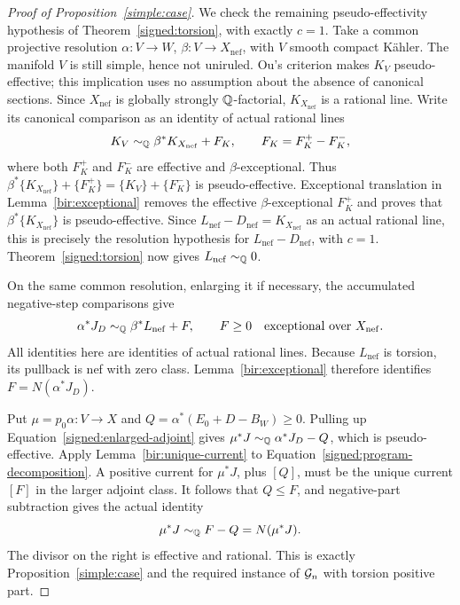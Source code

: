 \begin{proof}[Proof of Proposition~\ref{simple:case}]
We check the remaining pseudo-effectivity hypothesis of
Theorem~\ref{signed:torsion}, with exactly \(c=1\).
Take a common projective resolution
\(\alpha:V\to W\), \(\beta:V\to X_{\mathrm{nef}}\), with \(V\) smooth
compact Kähler.  The manifold \(V\) is still simple, hence
not uniruled.  Ou's criterion
\cite[Theorem~1.1]{Ou2025} makes \(K_V\) pseudo-effective;
this implication uses no assumption about the absence of
canonical sections.  Since \(X_{\mathrm{nef}}\) is globally strongly
\(\mathbb Q\)-factorial, \(K_{X_{\mathrm{nef}}}\) is a rational line.  Write its
canonical comparison as an identity of actual rational lines
\[
 K_V\sim_{\mathbb Q}\beta^*K_{X_{\mathrm{nef}}}+F_K,
 \qquad F_K=F_K^+-F_K^-,
\]
where both \(F_K^+\) and \(F_K^-\) are effective and
\(\beta\)-exceptional.  Thus
\(\beta^*\{K_{X_{\mathrm{nef}}}\}+\{F_K^+\}=\{K_V\}+\{F_K^-\}\) is
pseudo-effective.  Exceptional translation in
Lemma~\ref{bir:exceptional} removes the effective
\(\beta\)-exceptional \(F_K^+\) and proves that
\(\beta^*\{K_{X_{\mathrm{nef}}}\}\) is pseudo-effective.  Since
\(L_{\mathrm{nef}}-D_{\mathrm{nef}}=K_{X_{\mathrm{nef}}}\) as an actual
rational line, this is precisely the resolution hypothesis for
\(L_{\mathrm{nef}}-D_{\mathrm{nef}}\),
with \(c=1\).  Theorem~\ref{signed:torsion} now gives
\(L_{\mathrm{nef}}\sim_{\mathbb Q}0\).

On the same common resolution, enlarging it if necessary,
the accumulated negative-step comparisons give
\begin{equation}\label{signed:program-decomposition}
 \alpha^*J_D\sim_{\mathbb Q}\beta^*L_{\mathrm{nef}}+F,
 \qquad F\geq0\quad\text{exceptional over }X_{\mathrm{nef}}.
\end{equation}
All identities here are identities of actual rational
lines.  Because \(L_{\mathrm{nef}}\) is torsion, its pullback is nef
with zero class.  Lemma~\ref{bir:exceptional} therefore
identifies \(F=N(\alpha^*J_D)\).

Put \(\mu=p_0\alpha:V\to X\) and
\(Q=\alpha^*(E_0+D-B_W)\geq0\).  Pulling up
Equation~\eqref{signed:enlarged-adjoint} gives
\(\mu^*J\sim_{\mathbb Q}\alpha^*J_D-Q\), which is
pseudo-effective.  Apply Lemma~\ref{bir:unique-current}
to Equation~\eqref{signed:program-decomposition}.  A
positive current for \(\mu^*J\), plus \([Q]\), must be
the unique current \([F]\) in the larger adjoint class.
It follows that \(Q\leq F\), and negative-part
subtraction gives the actual identity
\[
 \mu^*J\sim_{\mathbb Q}F-Q=N(\mu^*J).
\]
The divisor on the right is effective and rational.  This
is exactly Proposition~\ref{simple:case} and the required
instance of \(\mathcal G_n\) with torsion positive part.
\end{proof}
